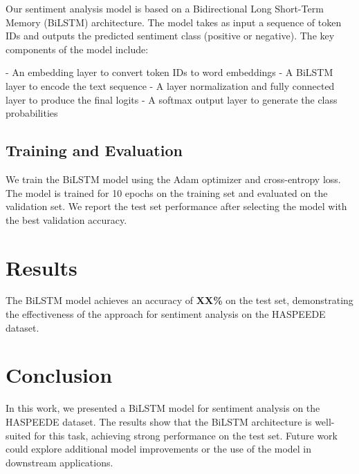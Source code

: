 \documentclass[11pt,a4paper]{article}
\begin{document}
Our sentiment analysis model is based on a Bidirectional Long Short-Term Memory (BiLSTM) architecture. The model takes as input a sequence of token IDs and outputs the predicted sentiment class (positive or negative). The key components of the model include:

- An embedding layer to convert token IDs to word embeddings
- A BiLSTM layer to encode the text sequence
- A layer normalization and fully connected layer to produce the final logits
- A softmax output layer to generate the class probabilities

\subsection{Training and Evaluation}
We train the BiLSTM model using the Adam optimizer and cross-entropy loss. The model is trained for 10 epochs on the training set and evaluated on the validation set. We report the test set performance after selecting the model with the best validation accuracy.

\section{Results}
The BiLSTM model achieves an accuracy of \textbf{XX\%} on the test set, demonstrating the effectiveness of the approach for sentiment analysis on the HASPEEDE dataset.

\section{Conclusion}
In this work, we presented a BiLSTM model for sentiment analysis on the HASPEEDE dataset. The results show that the BiLSTM architecture is well-suited for this task, achieving strong performance on the test set. Future work could explore additional model improvements or the use of the model in downstream applications.



\end{document}
